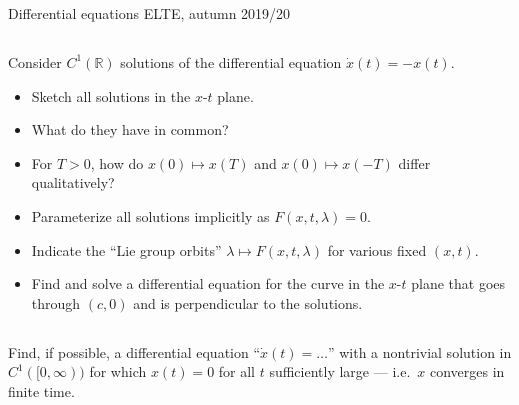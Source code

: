 \documentclass[12pt,a4paper]{article}
\begin{document}
    Differential equations
    \hfill
    ELTE, autumn 2019/20
    
    
    \subsection{}
    
    Consider $C^1(\mathbb{R})$ 
    solutions of the differential equation $\dot{x}(t) = -x(t)$.
    \begin{itemize}
    \item 
        Sketch all solutions in the $x$-$t$ plane.
    \item
        What do they have in common?
    \item
        For $T > 0$,
        how do
        $x(0) \mapsto x(T)$
        and
        $x(0) \mapsto x(-T)$
        differ qualitatively?
    \item
        Parameterize all solutions implicitly
        as $F(x, t, \lambda) = 0$.
    \item
        Indicate the ``Lie group orbits'' $\lambda \mapsto F(x, t, \lambda)$ for various fixed $(x, t)$.
    \item
        Find and solve a differential equation
        for the curve in the $x$-$t$ plane
        that goes
        through $(c, 0)$
        and is perpendicular
        to the solutions.
    \end{itemize}
    
    
    \subsection{}
    
    Find, if possible,
    a differential equation ``$\dot{x}(t) = \ldots$''
    with a nontrivial solution in $C^1([0, \infty))$
    for which
    $x(t) = 0$ for all $t$ sufficiently large ---
    i.e.~$x$ converges in finite time.
    
    
    
    \subsection{}
    
\end{document}
